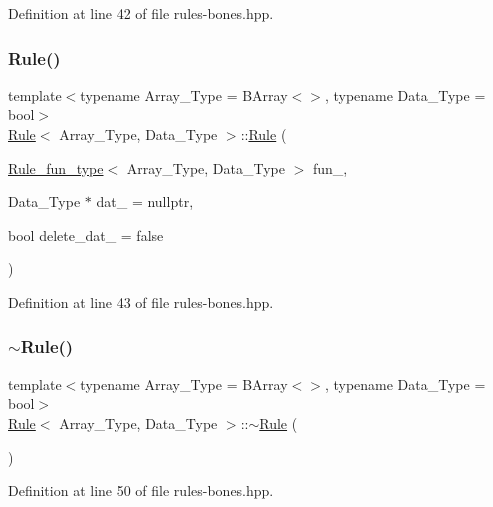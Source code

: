 Definition at line 42 of file rules-\/bones.\+hpp.

\mbox{\label{class_rule_ad0b81db664bed03f9a381f90ab617424}} 
\subsubsection{\texorpdfstring{Rule()}{Rule()}\hspace{0.1cm}{\footnotesize\ttfamily [2/2]}}
{\footnotesize\ttfamily template$<$typename Array\+\_\+\+Type = B\+Array$<$$>$, typename Data\+\_\+\+Type = bool$>$ \\
\hyperlink{class_rule}{Rule}$<$ Array\+\_\+\+Type, Data\+\_\+\+Type $>$\+::\hyperlink{class_rule}{Rule} (\begin{DoxyParamCaption}\item[{\hyperlink{typedefs_8hpp_a2e147c9c0e8b65be614c98a5dd400d5c}{Rule\+\_\+fun\+\_\+type}$<$ Array\+\_\+\+Type, Data\+\_\+\+Type $>$}]{fun\+\_\+,  }\item[{Data\+\_\+\+Type $\ast$}]{dat\+\_\+ = {\ttfamily nullptr},  }\item[{bool}]{delete\+\_\+dat\+\_\+ = {\ttfamily false} }\end{DoxyParamCaption})\hspace{0.3cm}{\ttfamily [inline]}}



Definition at line 43 of file rules-\/bones.\+hpp.

\mbox{\label{class_rule_a9f7e4ac4893005c7d4ecc2781f0f727d}} 
\subsubsection{\texorpdfstring{$\sim$\+Rule()}{~Rule()}}
{\footnotesize\ttfamily template$<$typename Array\+\_\+\+Type = B\+Array$<$$>$, typename Data\+\_\+\+Type = bool$>$ \\
\hyperlink{class_rule}{Rule}$<$ Array\+\_\+\+Type, Data\+\_\+\+Type $>$\+::$\sim$\hyperlink{class_rule}{Rule} (\begin{DoxyParamCaption}{ }\end{DoxyParamCaption})\hspace{0.3cm}{\ttfamily [inline]}}



Definition at line 50 of file rules-\/bones.\+hpp.



